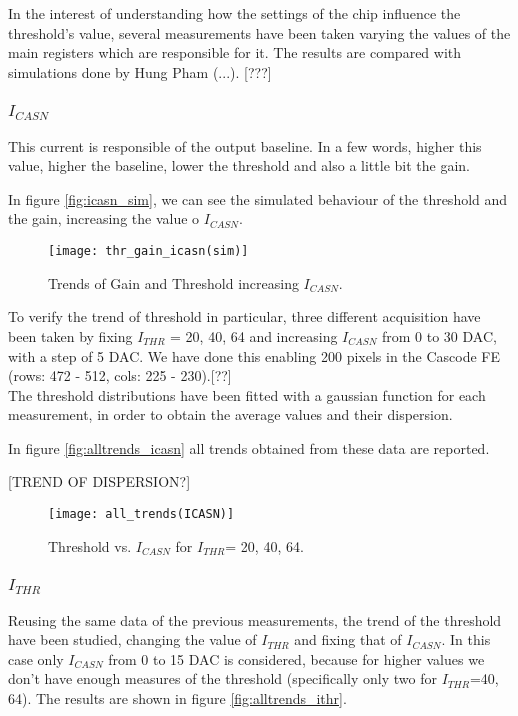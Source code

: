 In the interest of understanding how the settings of the chip influence the threshold's value, several measurements have been taken varying the values of the main registers which are responsible for it.
The results are compared with simulations done by Hung Pham (...). [???]

\subsubsection{$I_{CASN}$}

This current is responsible of the output baseline. In a few words, higher this value, higher the baseline, lower the threshold and also a little bit the gain.

In figure \vref{fig:icasn_sim}, we can see the simulated behaviour of the threshold and the gain, increasing the value o $I_{CASN}$.

\begin{figure}[h!]
\centering
\texttt{[image: thr\_gain\_icasn(sim)]}
\caption{Trends of Gain and Threshold increasing $I_{CASN}$.}
\label{fig:icasn_sim}
\end{figure}

To verify the trend of threshold in particular, three different acquisition have been taken by fixing $I_{THR}$ = 20, 40, 64 and increasing $I_{CASN}$ from 0  to 30 DAC, with a step of 5 DAC. We have done this enabling 200 pixels in the Cascode FE (rows: 472 - 512, cols: 225 - 230).[??]\\

The threshold distributions have been fitted with a gaussian function for each measurement,  in order to obtain the average values and their dispersion.

In figure \vref{fig:alltrends_icasn} all trends obtained from these data are reported.

[TREND OF DISPERSION?]

\begin{figure}[h!]
\centering
\texttt{[image: all\_trends(ICASN)]}
\caption{Threshold vs. $I_{CASN}$ for $I_{THR}$= 20, 40, 64.}
\label{fig:alltrends_icasn}
\end{figure}


\subsubsection{$I_{THR}$}

Reusing the same data of the previous measurements, the trend of the threshold have been studied, changing the value of $I_{THR}$ and fixing that of $I_{CASN}$. In this case only $I_{CASN}$ from 0 to 15 DAC is considered, because for higher values we don't have enough measures of the threshold (specifically only two for $I_{THR}$=40, 64). The results are shown in figure \vref{fig:alltrends_ithr}.

